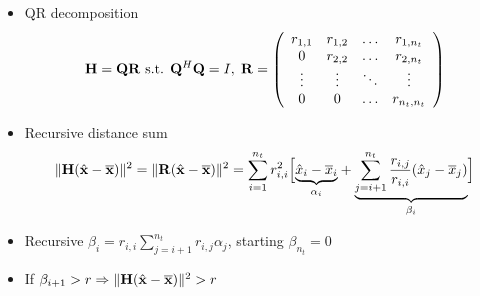 \documentclass[xcolor=dvipsnames,aspectratio=169]{beamer}
\begin{document}
{  \begin{itemize}
            \item QR decomposition 
            $$\mathbf{H}=\mathbf{Q}\mathbf{R}\textnormal{ s.t. }\mathbf{Q}^H\mathbf{Q}=I,\;\mathbf{R}=\left(\begin{array}{cccc}
            r_{1,1}&r_{1,2}&\dots&r_{1,n_t}\\
            0&r_{2,2}&\dots&r_{2,n_t}\\
            \vdots&\vdots&\ddots&\vdots\\
            0&0&\dots&r_{n_t,n_t}\\
\end{array}\right)$$
            \item Recursive distance sum
$$\|\mathbf{H}(\hat{\mathbf{x}}-\overline{\mathbf{x}})\|^2=\|\mathbf{R}(\hat{\mathbf{x}}-\overline{\mathbf{x}})\|^2=\sum_{i=1}^{n_t}r_{i,i}^2\Big[\underset{\alpha_i}{\underbrace{\hat{x}_i-\overline{x}_i}}+\underset{\beta_i}{\underbrace{\sum_{j=i+1}^{n_t}\frac{r_{i,j}}{r_{i,i}}(\hat{x}_j-\overline{x}_j)}}\Big]$$
            \item Recursive $\beta_i=r_{i,i}\sum_{j=i+1}^{n_t}r_{i,j}\alpha_j$, starting $\beta_{n_t}=0$
            \item If $\beta_{i+1}>r\Rightarrow \|\mathbf{H}(\hat{\mathbf{x}}-\overline{\mathbf{x}})\|^2>r$
        \end{itemize}
  \begin{columns}
 \begin{column}{6cm}
 

\end{column}
\end{columns}}
\end{document}
